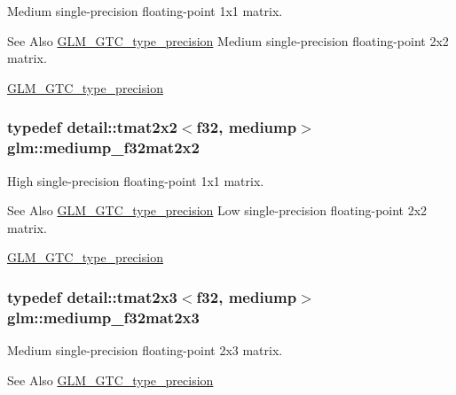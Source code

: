 Medium single-\/precision floating-\/point 1x1 matrix. \begin{DoxySeeAlso}{See Also}
\hyperlink{group__gtc__type__precision}{G\-L\-M\-\_\-\-G\-T\-C\-\_\-type\-\_\-precision} Medium single-\/precision floating-\/point 2x2 matrix. 

\hyperlink{group__gtc__type__precision}{G\-L\-M\-\_\-\-G\-T\-C\-\_\-type\-\_\-precision} 
\end{DoxySeeAlso}
\hypertarget{group__gtc__type__precision_ga23c9239d6aa9b41c3d2145e2faa81edb}{
\subsubsection[{mediump\-\_\-f32mat2x2}]{\setlength{\rightskip}{0pt plus 5cm}typedef detail\-::tmat2x2$<$f32, mediump$>$ {\bf glm\-::mediump\-\_\-f32mat2x2}}}\label{group__gtc__type__precision_ga23c9239d6aa9b41c3d2145e2faa81edb}
High single-\/precision floating-\/point 1x1 matrix. \begin{DoxySeeAlso}{See Also}
\hyperlink{group__gtc__type__precision}{G\-L\-M\-\_\-\-G\-T\-C\-\_\-type\-\_\-precision} Low single-\/precision floating-\/point 2x2 matrix. 

\hyperlink{group__gtc__type__precision}{G\-L\-M\-\_\-\-G\-T\-C\-\_\-type\-\_\-precision} 
\end{DoxySeeAlso}
\hypertarget{group__gtc__type__precision_ga42497d19668931d225bccf1b9c614c19}{
\subsubsection[{mediump\-\_\-f32mat2x3}]{\setlength{\rightskip}{0pt plus 5cm}typedef detail\-::tmat2x3$<$f32, mediump$>$ {\bf glm\-::mediump\-\_\-f32mat2x3}}}\label{group__gtc__type__precision_ga42497d19668931d225bccf1b9c614c19}
Medium single-\/precision floating-\/point 2x3 matrix. \begin{DoxySeeAlso}{See Also}
\hyperlink{group__gtc__type__precision}{G\-L\-M\-\_\-\-G\-T\-C\-\_\-type\-\_\-precision} 
\end{DoxySeeAlso}
